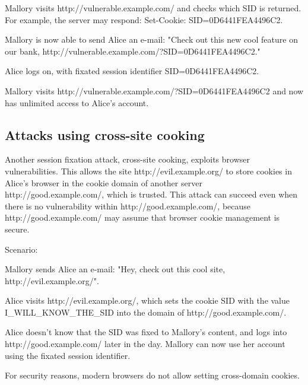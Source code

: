 \begin{compactenum}
\item Mallory visits http://vulnerable.example.com/ and checks which SID is returned. For example, the server may respond: Set-Cookie: SID=0D6441FEA4496C2.
\item Mallory is now able to send Alice an e-mail: "Check out this new cool feature on our bank, http://vulnerable.example.com/?SID=0D6441FEA4496C2."
\item Alice logs on, with fixated session identifier SID=0D6441FEA4496C2.
\item Mallory visits http://vulnerable.example.com/?SID=0D6441FEA4496C2 and now has unlimited access to Alice's account.
\end{compactenum}








\subsection{Attacks using cross-site cooking}



Another session fixation attack, cross-site cooking, exploits browser vulnerabilities. This allows the site http://evil.example.org/ to store cookies in Alice's browser in the cookie domain of another server http://good.example.com/, which is trusted. This attack can succeed even when there is no vulnerability within http://good.example.com/, because http://good.example.com/ may assume that browser cookie management is secure.

Scenario:


\begin{compactenum}
\item Mallory sends Alice an e-mail: "Hey, check out this cool site, http://evil.example.org/".
\item Alice visits http://evil.example.org/, which sets the cookie SID with the value I\_WILL\_KNOW\_THE\_SID into the domain of http://good.example.com/.
\item Alice doesn't know that the SID was fixed to Mallory's content, and logs into http://good.example.com/ later in the day. Mallory can now use her account using the fixated session identifier.

\end{compactenum}

For security reasons, modern browsers do not allow setting cross-domain cookies.









